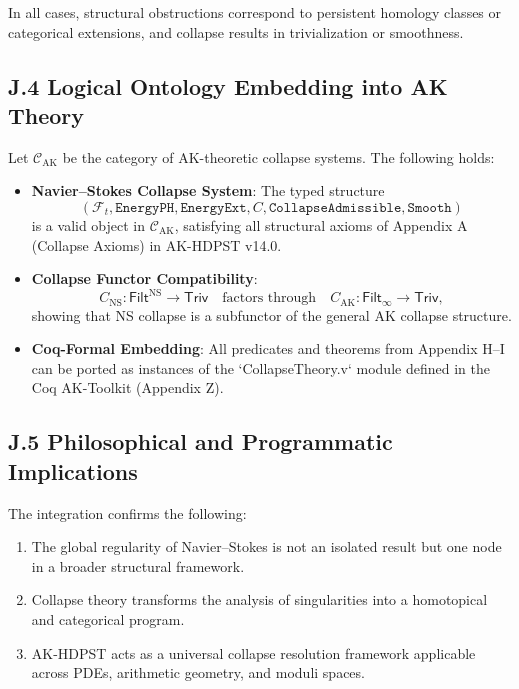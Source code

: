 \documentclass[11pt]{article}
\begin{document}
In all cases, structural obstructions correspond to persistent homology classes or categorical extensions, and collapse results in trivialization or smoothness.

\subsection*{J.4 Logical Ontology Embedding into AK Theory}

Let \( \mathcal{C}_{\mathrm{AK}} \) be the category of AK-theoretic collapse systems. The following holds:

\begin{itemize}
  \item \textbf{Navier--Stokes Collapse System}: The typed structure
  \[
  \left( \mathcal{F}_t, \texttt{EnergyPH}, \texttt{EnergyExt}, C, \texttt{CollapseAdmissible}, \texttt{Smooth} \right)
  \]
  is a valid object in \( \mathcal{C}_{\mathrm{AK}} \), satisfying all structural axioms of Appendix A (Collapse Axioms) in AK-HDPST v14.0.

  \item \textbf{Collapse Functor Compatibility}:
  \[
  C_{\mathrm{NS}} : \mathsf{Filt}^{\mathrm{NS}} \to \mathsf{Triv} \quad \text{factors through} \quad C_{\mathrm{AK}} : \mathsf{Filt}_{\infty} \to \mathsf{Triv},
  \]
  showing that NS collapse is a subfunctor of the general AK collapse structure.

  \item \textbf{Coq-Formal Embedding}:
  All predicates and theorems from Appendix H–I can be ported as instances of the `CollapseTheory.v` module defined in the Coq AK-Toolkit (Appendix Z).
\end{itemize}

\subsection*{J.5 Philosophical and Programmatic Implications}

The integration confirms the following:

\begin{enumerate}
  \item The global regularity of Navier--Stokes is not an isolated result but one node in a broader structural framework.
  \item Collapse theory transforms the analysis of singularities into a homotopical and categorical program.
  \item AK-HDPST acts as a universal collapse resolution framework applicable across PDEs, arithmetic geometry, and moduli spaces.
\end{enumerate}
\end{document}
